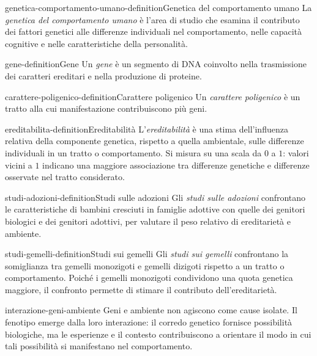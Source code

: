 \documentclass[preview]{standalone}
\begin{document}
\begin{snippetdefinition}{genetica-comportamento-umano-definition}{Genetica del comportamento umano}
    La \emph{genetica del comportamento umano} è l'area di studio che esamina
    il contributo dei fattori genetici alle differenze individuali nel
    comportamento, nelle capacità cognitive e nelle caratteristiche della
    personalità.
\end{snippetdefinition}

\begin{snippetdefinition}{gene-definition}{Gene}
    Un \emph{gene} è un segmento di DNA coinvolto nella trasmissione dei
    caratteri ereditari e nella produzione di proteine.
\end{snippetdefinition}

\begin{snippetdefinition}{carattere-poligenico-definition}{Carattere poligenico}
    Un \emph{carattere poligenico} è un tratto alla cui manifestazione
    contribuiscono più geni.
\end{snippetdefinition}

\begin{snippetdefinition}{ereditabilita-definition}{Ereditabilità}
    L'\emph{ereditabilità} è una stima dell'influenza relativa della componente
    genetica, rispetto a quella ambientale, sulle differenze individuali in un
    tratto o comportamento. Si misura su una scala da \(0\) a \(1\): valori
    vicini a \(1\) indicano una maggiore associazione tra differenze genetiche
    e differenze osservate nel tratto considerato.
\end{snippetdefinition}

\begin{snippetdefinition}{studi-adozioni-definition}{Studi sulle adozioni}
    Gli \emph{studi sulle adozioni} confrontano le caratteristiche di bambini
    cresciuti in famiglie adottive con quelle dei genitori biologici e dei
    genitori adottivi, per valutare il peso relativo di ereditarietà e ambiente.
\end{snippetdefinition}

\begin{snippetdefinition}{studi-gemelli-definition}{Studi sui gemelli}
    Gli \emph{studi sui gemelli} confrontano la somiglianza tra gemelli
    monozigoti e gemelli dizigoti rispetto a un tratto o comportamento. Poiché
    i gemelli monozigoti condividono una quota genetica maggiore, il confronto
    permette di stimare il contributo dell'ereditarietà.
\end{snippetdefinition}

\begin{snippet}{interazione-geni-ambiente}
    Geni e ambiente non agiscono come cause isolate. Il fenotipo emerge dalla
    loro interazione: il corredo genetico fornisce possibilità biologiche, ma
    le esperienze e il contesto contribuiscono a orientare il modo in cui tali
    possibilità si manifestano nel comportamento.
\end{snippet}
\end{document}
